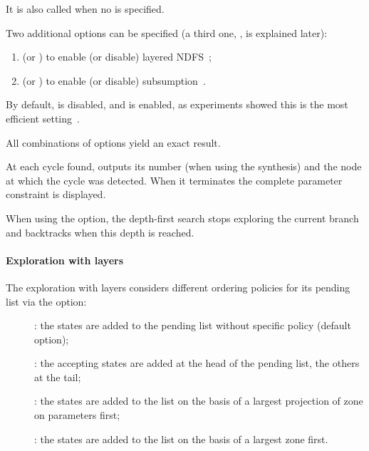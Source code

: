 It is also called when no  is specified.

Two additional options can be specified (a third one, , is explained later):
\begin{enumerate}
	\item {} (or ) to enable (or disable) layered NDFS~\cite{NPP18};
	\item {} (or ) to enable (or disable) subsumption~\cite{NPP18}.
\end{enumerate}
By default,  is disabled, and  is enabled, as experiments showed this is the most efficient setting~\cite{NPP18}.

All combinations of options yield an exact result.




At each cycle found, \imitator{} outputs its number (when using the synthesis) and
the node at which the cycle was detected. When it terminates the complete parameter
constraint is displayed.


When using the  option, the depth-first search stops exploring
the current branch and backtracks when this depth is reached.


\paragraph{Exploration with layers}
The exploration with layers considers different ordering policies for its pending
list via the  option:
\begin{description}
	\item[]: the states are added to the pending list
	      without specific policy	(default option);
	\item[]: the accepting states are added at
	      the head of the pending list, the others at the tail;
	\item[]: the states are added to the list on
	      the basis of a largest projection of zone on parameters first;
	\item[]: the states are added to the list on
	      the basis of a largest zone first.
\end{description}



